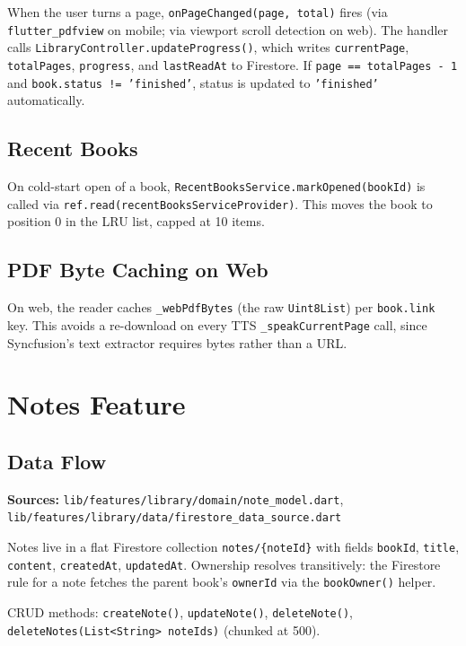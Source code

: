 \documentclass[11pt,a4paper]{article}
\begin{document}
When the user turns a page, \texttt{onPageChanged(page, total)} fires (via
\texttt{flutter\_pdfview} on mobile; via viewport scroll detection on web). The handler
calls \texttt{LibraryController.updateProgress()}, which writes
\texttt{currentPage}, \texttt{totalPages}, \texttt{progress}, and
\texttt{lastReadAt} to Firestore. If \texttt{page == totalPages - 1} and
\texttt{book.status != 'finished'}, status is updated to \texttt{'finished'} automatically.

\subsection{Recent Books}

On cold-start open of a book, \texttt{RecentBooksService.markOpened(bookId)} is called
via \texttt{ref.read(recentBooksServiceProvider)}. This moves the book to position 0 in
the LRU list, capped at 10 items.

\subsection{PDF Byte Caching on Web}

On web, the reader caches \texttt{\_webPdfBytes} (the raw \texttt{Uint8List}) per
\texttt{book.link} key. This avoids a re-download on every TTS \texttt{\_speakCurrentPage}
call, since Syncfusion's text extractor requires bytes rather than a URL.

\section{Notes Feature}

\subsection{Data Flow}

\textbf{Sources:} \texttt{lib/features/library/domain/note\_model.dart},
\texttt{lib/features/library/data/firestore\_data\_source.dart}

Notes live in a flat Firestore collection \texttt{notes/\{noteId\}} with fields
\texttt{bookId}, \texttt{title}, \texttt{content}, \texttt{createdAt},
\texttt{updatedAt}. Ownership resolves transitively: the Firestore rule for a note
fetches the parent book's \texttt{ownerId} via the \texttt{bookOwner()} helper.

CRUD methods: \texttt{createNote()}, \texttt{updateNote()}, \texttt{deleteNote()},
\texttt{deleteNotes(List<String> noteIds)} (chunked at 500).
\end{document}
